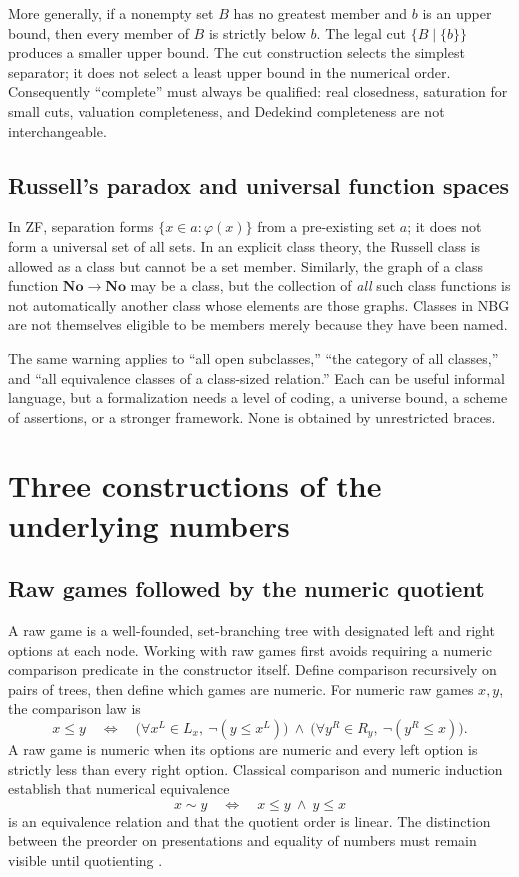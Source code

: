 \documentclass[11pt,letterpaper]{article}
\numberwithin{equation}{section}
\theoremstyle{definition}
\theoremstyle{remark}
\newcommand{\No}{\mathbf{No}}
\begin{document}
More generally, if a nonempty set $B$ has no greatest member and $b$ is an upper bound, then every member of $B$ is strictly below $b$. The legal cut $\{B\mid\{b\}\}$ produces a smaller upper bound. The cut construction selects the simplest separator; it does not select a least upper bound in the numerical order. Consequently ``complete'' must always be qualified: real closedness, saturation for small cuts, valuation completeness, and Dedekind completeness are not interchangeable.

\subsection{Russell's paradox and universal function spaces}
In ZF, separation forms $\{x\in a:\varphi(x)\}$ from a pre-existing set $a$; it does not form a universal set of all sets. In an explicit class theory, the Russell class is allowed as a class but cannot be a set member. Similarly, the graph of a class function $\No\to\No$ may be a class, but the collection of \emph{all} such class functions is not automatically another class whose elements are those graphs. Classes in NBG are not themselves eligible to be members merely because they have been named.

The same warning applies to ``all open subclasses,'' ``the category of all classes,'' and ``all equivalence classes of a class-sized relation.'' Each can be useful informal language, but a formalization needs a level of coding, a universe bound, a scheme of assertions, or a stronger framework. None is obtained by unrestricted braces.

\section{Three constructions of the underlying numbers}\label{sec:constructions}

\subsection{Raw games followed by the numeric quotient}
A raw game is a well-founded, set-branching tree with designated left and right options at each node. Working with raw games first avoids requiring a numeric comparison predicate in the constructor itself. Define comparison recursively on pairs of trees, then define which games are numeric. For numeric raw games $x,y$, the comparison law is
\begin{equation}\label{eq:comparison}
x\le y\quad\Longleftrightarrow\quad
\bigl(\forall x^L\in L_x,\ \neg(y\le x^L)\bigr)
\ \land\ 
\bigl(\forall y^R\in R_y,\ \neg(y^R\le x)\bigr).
\end{equation}
A raw game is numeric when its options are numeric and every left option is strictly less than every right option. Classical comparison and numeric induction establish that numerical equivalence
\[
x\sim y\quad\Longleftrightarrow\quad x\le y\ \land\ y\le x
\]
is an equivalence relation and that the quotient order is linear. The distinction between the preorder on presentations and equality of numbers must remain visible until quotienting \cite{Conway}.
\end{document}
